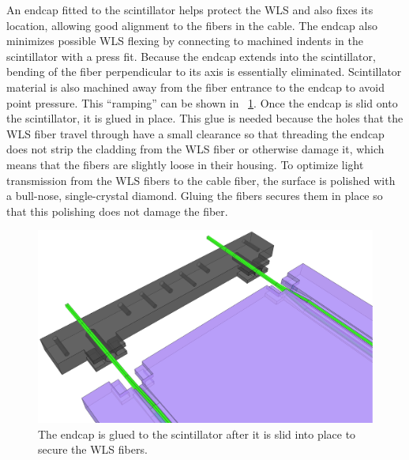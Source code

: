An endcap fitted to the scintillator helps protect the WLS and also fixes its location, allowing good alignment to the fibers in the cable.  The endcap also minimizes possible WLS flexing by connecting to machined indents in the scintillator with a press fit.  Because the endcap extends into the scintillator, bending of the fiber perpendicular to its axis is essentially eliminated.  Scintillator material is also machined away from the fiber entrance to the endcap to avoid point pressure.  This ``ramping'' can be shown in {\fig}~\ref{fig:paddleAssembly}.  Once the endcap is slid onto the scintillator, it is glued in place.  This glue is needed because the holes that the WLS fiber travel through have a small clearance so that threading the endcap does not strip the cladding from the WLS fiber or otherwise damage it, which means that the fibers are slightly loose in their housing.  To optimize light transmission from the WLS fibers to the cable fiber, the surface is polished with a bull-nose, single-crystal diamond.  Gluing the fibers secures them in place so that this polishing does not damage the fiber.  
\begin{figure}[!htbp]
\centering
\includegraphics[width=1.0\textwidth]{figures/veto_assembly.eps}
\caption{The endcap is glued to the scintillator after it is slid into place to secure the WLS fibers.}
\label{fig:paddleAssembly}
\end{figure}

